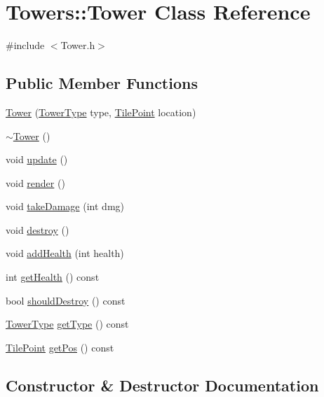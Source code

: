 \hypertarget{classTowers_1_1Tower}{}\section{Towers\+:\+:Tower Class Reference}
\label{classTowers_1_1Tower}


{\ttfamily \#include $<$Tower.\+h$>$}

\subsection*{Public Member Functions}
\begin{DoxyCompactItemize}
\item 
\hyperlink{classTowers_1_1Tower_a6511a081fb1432562ef2cbbb451d50b9}{Tower} (\hyperlink{namespaceTowers_a6f61f1aa71f1052d02a163c184fc35b0}{Tower\+Type} type, \hyperlink{classLocation_1_1TilePoint}{Tile\+Point} location)
\item 
\hyperlink{classTowers_1_1Tower_a2f85aed489c39e547e44efcfe485869a}{$\sim$\+Tower} ()
\item 
void \hyperlink{classTowers_1_1Tower_a7bab24bb1608d1ab2dcdff9b6a7fb13b}{update} ()
\item 
void \hyperlink{classTowers_1_1Tower_a23e1e979de18daa1429cc1365037ba54}{render} ()
\item 
void \hyperlink{classTowers_1_1Tower_a637a00f1f82be01b86191bed853d9ea1}{take\+Damage} (int dmg)
\item 
void \hyperlink{classTowers_1_1Tower_a43f7e77c091249a320f4fc2222954711}{destroy} ()
\item 
void \hyperlink{classTowers_1_1Tower_ab9f7f72ebb28e6541adfbfd1cd27b783}{add\+Health} (int health)
\item 
int \hyperlink{classTowers_1_1Tower_ad2ad885a95f2207f086cf732523d6607}{get\+Health} () const 
\item 
bool \hyperlink{classTowers_1_1Tower_a7f844f6ea445d353dcb6e30708c95b61}{should\+Destroy} () const 
\item 
\hyperlink{namespaceTowers_a6f61f1aa71f1052d02a163c184fc35b0}{Tower\+Type} \hyperlink{classTowers_1_1Tower_a8fc0eacb236e7944b84b458e9999ac02}{get\+Type} () const 
\item 
\hyperlink{classLocation_1_1TilePoint}{Tile\+Point} \hyperlink{classTowers_1_1Tower_affe32d9c4ca9972c6050ebad896249f1}{get\+Pos} () const 
\end{DoxyCompactItemize}


\subsection{Constructor \& Destructor Documentation}
